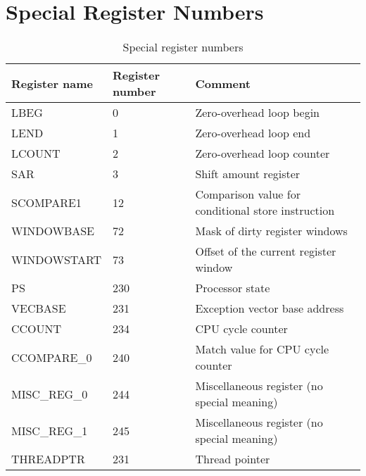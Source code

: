 \chapter{Special Register Numbers}
\begin{table}[htbp]
    \caption{Special register numbers \cite{specreg}}
    \begin{tabular}{lll}
        \hline
        Register name & Register number & Comment \\
        \hline
        LBEG & 0 & Zero-overhead loop begin \\
        LEND & 1 &  Zero-overhead loop end \\
        LCOUNT & 2 &  Zero-overhead loop counter \\
        SAR & 3 & Shift amount register \\
        SCOMPARE1 & 12 & Comparison value for conditional store instruction \\
        WINDOWBASE & 72 & Mask of dirty register windows \\
        WINDOWSTART & 73 & Offset of the current register window \\
        PS & 230 & Processor state \\
        VECBASE & 231 & Exception vector base address \\
        CCOUNT & 234 & CPU cycle counter \\
        CCOMPARE\_0 & 240 & Match value for CPU cycle counter \\
        MISC\_REG\_0 & 244 & Miscellaneous register (no special meaning)\\
        MISC\_REG\_1 & 245 & Miscellaneous register (no special meaning)\\
        THREADPTR & 231 & Thread pointer \\
        \hline
    \end{tabular}
\end{table}
